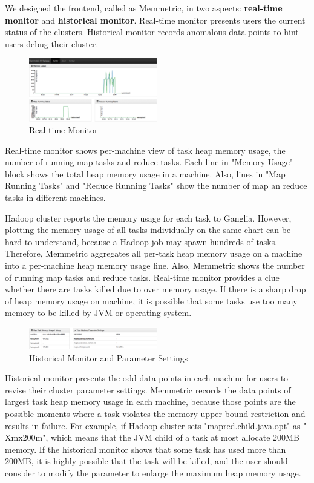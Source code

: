 We designed the frontend, called as Memmetric, in two aspects: \textbf{real-time monitor} and \textbf{historical monitor}. Real-time monitor  presents users the current status of the clusters. Historical monitor records anomalous data points to hint users debug their cluster.

\begin{figure}[h!]
  \caption{Real-time Monitor}
  \centering
    \includegraphics[width=0.5\textwidth]{image/real-time-monitor.png}
\end{figure}

Real-time monitor shows per-machine view of task heap memory usage, the number of running map tasks and reduce tasks. Each line in "Memory Usage" block shows the total heap memory usage in a machine. Also, lines in "Map Running Tasks" and "Reduce Running Tasks" show the number of map an reduce tasks in different machines.

Hadoop cluster reports the memory usage for each task to Ganglia. However, plotting the memory usage of all tasks individually on the same chart can be hard to understand, because a Hadoop job may spawn hundreds of tasks. Therefore, Memmetric aggregates all per-task heap memory usage on a machine into a per-machine heap memory usage line. Also, Memmetric shows the number of running map tasks and reduce tasks. Real-time monitor provides a clue whether there are tasks killed due to over memory usage. If there is a sharp drop of heap memory usage on machine, it is possible that some tasks use too many memory to be killed by JVM or operating system. 

\begin{figure}[h!]
  \caption{Historical Monitor and Parameter Settings}
  \centering
    \includegraphics[width=0.5\textwidth]{image/historical-monitor.png}
\end{figure}

Historical monitor presents the odd data points in each machine for users to revise their cluster parameter settings. Memmetric records the data points of largest task heap memory usage in each machine, because those points are the possible moments where a task violates the memory upper bound restriction and results in failure. For example, if Hadoop cluster sets "mapred.child.java.opt" as "-Xmx200m", which means that  the JVM child of a task at most allocate 200MB memory. If the historical monitor shows that some task has used more than 200MB, it is highly possible that the task will be killed, and the user should consider to modify the parameter to enlarge the maximum heap memory usage.

